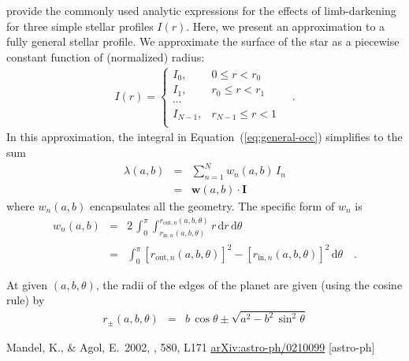\documentclass[12pt,preprint]{aastex}
\newcommand{\Eq}[1]{Equation~(\ref{eq:#1})}
\newcommand{\eq}[1]{\Eq{#1}}
\newcommand{\dd}{\mathrm{d}}
\newcommand{\bvec}[1]{\boldsymbol{#1}}
\begin{document}
\citet{mandel} provide the commonly used analytic expressions for the effects
of limb-darkening for three simple stellar profiles $I(r)$. Here, we present
an approximation to a fully general stellar profile. We approximate the
surface of the star as a piecewise constant function of (normalized) radius:
\begin{eqnarray}
    I(r) = \left \{ \begin{array}{ll}
        I_0, & 0 \le r < r_0 \\
        I_1, & r_0 \le r < r_1 \\
        \cdots & \\
        I_{N-1}, & r_{N-1} \le r < 1 \\
    \end{array}\right . \quad.
\end{eqnarray}
In this approximation, the integral in \eq{general-occ} simplifies to the sum
\begin{eqnarray}
    \lambda(a, b) & = & \sum_{n=1}^N w_n (a, b) \, I_n \\
                  & = & \bvec{w} (a, b) \cdot \bvec{I}
\end{eqnarray}
where $w_n(a, b)$ encapsulates all the geometry. The specific form of $w_n$ is
\begin{eqnarray}
    w_n (a, b) & = & 2 \, \int_0 ^\pi \int_{r_{\mathrm{in},n} (a, b, \theta)}
        ^{r_{\mathrm{out},n} (a, b, \theta)} r \, \dd r \, \dd \theta \\
    & = & \int_0 ^\pi [ r_{\mathrm{out},n} (a, b, \theta) ]^2  -
        [ r_{\mathrm{in},n} (a, b, \theta) ]^2 \, \dd \theta
    \quad.
\end{eqnarray}

At given $(a, b, \theta)$, the radii of the edges of the planet are given
(using the cosine rule) by
\begin{eqnarray}
    r_\pm (a, b, \theta) & = & b \, \cos \theta \pm \sqrt{a^2 -
        b^2\,\sin^2\theta}
\end{eqnarray}




\acknowledgments

\newcommand{\arxiv}[1]{\href{http://arxiv.org/abs/#1}{arXiv:#1}}
\begin{thebibliography}{}\raggedright

        Mandel, K., \& Agol, E.\ 2002, \apjl, 580, L171
        \arxiv{astro-ph/0210099} [astro-ph]

\end{thebibliography}
\end{document}
